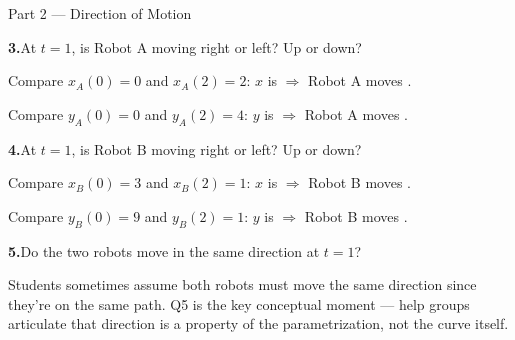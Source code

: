 \documentclass[10pt]{article}
\begin{document}
\begin{notesbox}{Part 2 --- Direction of Motion}

\textbf{3.}\quad At $t = 1$, is Robot A moving right or left? Up or down?

\vspace{4pt}
Compare $x_A(0) = 0$ and $x_A(2) = 2$: $x$ is  $\Rightarrow$ Robot A moves .

Compare $y_A(0) = 0$ and $y_A(2) = 4$: $y$ is  $\Rightarrow$ Robot A moves .

\vspace{0.10in}
\textbf{4.}\quad At $t = 1$, is Robot B moving right or left? Up or down?

\vspace{4pt}
Compare $x_B(0) = 3$ and $x_B(2) = 1$: $x$ is  $\Rightarrow$ Robot B moves .

Compare $y_B(0) = 9$ and $y_B(2) = 1$: $y$ is  $\Rightarrow$ Robot B moves .

\vspace{0.10in}
\textbf{5.}\quad Do the two robots move in the same direction at $t = 1$?

\vspace{4pt}

\begin{teachernote}
  Students sometimes assume both robots must move the same direction since they're on the
  same path. Q5 is the key conceptual moment --- help groups articulate that direction is
  a property of the parametrization, not the curve itself.
\end{teachernote}

\end{notesbox}

\vspace{0.08in}
\end{document}
